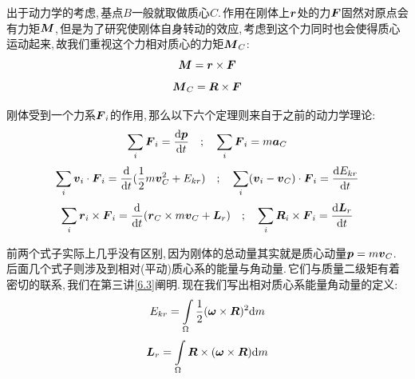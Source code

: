 出于动力学的考虑,\,基点$B$一般就取做质心$C$.\,作用在刚体上$\boldsymbol{r}$处的力$\boldsymbol{F}$固然对原点会有力矩$\boldsymbol{M}$,\,但是为了研究使刚体自身转动的效应,\,考虑到这个力同时也会使得质心运动起来,\,故我们重视这个力相对质心的力矩$\boldsymbol{M}_C$:
\[\boldsymbol{M}=\boldsymbol{r}\times\boldsymbol{F}\]
\[\boldsymbol{M}_C=\boldsymbol{R}\times\boldsymbol{F}\]

刚体受到一个力系${\boldsymbol{F}_i}$的作用,\,那么以下六个定理则来自于之前的动力学理论:
\[\sum_i\boldsymbol{F}_i=\frac{\textrm{d} \boldsymbol{p}}{\textrm{d} t}\quad ; \quad \sum_i\boldsymbol{F}_i=m\boldsymbol{a}_C\]
\[\sum_i \boldsymbol{v}_i\cdot \boldsymbol{F}_i=\frac{\textrm{d} }{\textrm{d} t}(\frac{1}{2}m\boldsymbol{v}_C^2+E_{kr})\quad ;\quad \sum_i(\boldsymbol{v}_i-\boldsymbol{v}_C)\cdot \boldsymbol{F}_i=\frac{\textrm{d} E_{kr}}{\textrm{d} t}\]
\[\sum_i \boldsymbol{r}_i\times \boldsymbol{F}_i=\frac{\textrm{d} }{\textrm{d} t}(\boldsymbol{r}_C\times m\boldsymbol{v}_C+\boldsymbol{L}_r)\quad ;\quad \sum_i \boldsymbol{R}_i\times \boldsymbol{F}_i=\frac{\textrm{d} \boldsymbol{L}_r}{\textrm{d} t}\]

前两个式子实际上几乎没有区别,\,因为刚体的总动量其实就是质心动量$\boldsymbol{p}=m\boldsymbol{v}_C$.\,后面几个式子则涉及到相对(平动)质心系的能量与角动量.\,它们与质量二级矩有着密切的联系,\,我们在第三讲\ref{6.3}阐明.\,现在我们写出相对质心系能量角动量的定义:
\[E_{kr}=\int\limits_\Omega \frac{1}{2}(\boldsymbol{\omega}\times \boldsymbol{R})^2\textrm{d} m\]
\[\boldsymbol{L}_r=\int\limits_\Omega \boldsymbol{R}\times(\boldsymbol{\omega}\times \boldsymbol{R})\textrm{d} m\]




